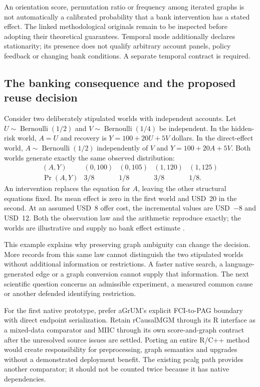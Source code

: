 An orientation score, permutation ratio or frequency among iterated graphs
is not automatically a calibrated probability that a bank intervention has
a stated effect. The linked methodological originals remain to be inspected
before adopting their theoretical guarantees. Temporal mode additionally
declares stationarity; its presence does not qualify arbitrary account panels,
policy feedback or changing bank conditions. A separate temporal contract is
required.

\subsection{The banking consequence and the proposed reuse decision}

Consider two deliberately stipulated worlds with independent accounts.
Let $U\sim\operatorname{Bernoulli}(1/2)$ and
$V\sim\operatorname{Bernoulli}(1/4)$ be independent. In the hidden-risk world,
$A=U$ and recovery is $Y=100+20U+5V$ dollars. In the direct-effect world,
$A\sim\operatorname{Bernoulli}(1/2)$ independently of $V$ and
$Y=100+20A+5V$. Both worlds generate exactly the same observed distribution:
\[
\begin{array}{c|rrrr}
(A,Y)&(0,100)&(0,105)&(1,120)&(1,125)\\
\Pr(A,Y)&3/8&1/8&3/8&1/8.
\end{array}
\]
An intervention replaces the equation for $A$, leaving the other structural
equations fixed. Its mean effect is zero in the first world and USD~20 in the
second. At an assumed USD~8 offer cost, the incremental values are USD~$-8$
and USD~12. Both the observation law and the arithmetic reproduce exactly;
the worlds are illustrative and supply no bank effect estimate
\citep{exec14_native_oracle}.

This example explains why preserving graph ambiguity can change the decision.
More records from this same law cannot distinguish the two stipulated worlds
without additional information or restrictions. A faster native search, a
language-generated edge or a graph conversion cannot supply that information.
The next scientific question concerns an admissible experiment, a measured
common cause or another defended identifying restriction.

For the first native prototype, prefer aGrUM's explicit FCI-to-PAG boundary
with direct endpoint serialization. Retain rCausalMGM through its R interface
as a mixed-data comparator and MIIC through its own score-and-graph contract
after the unresolved source issues are settled. Porting an entire R/C++ method
would create responsibility for preprocessing, graph semantics and upgrades
without a demonstrated deployment benefit. The existing pcalg path provides
another comparator; it should not be counted twice because it has native
dependencies.

